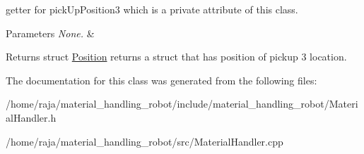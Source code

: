 getter for pick\+Up\+Position3 which is a private attribute of this class. 


\begin{DoxyParams}{Parameters}
{\em None.} & \\
\hline
\end{DoxyParams}
\begin{DoxyReturn}{Returns}
struct \hyperlink{structPosition}{Position} returns a struct that has position of pickup 3 location. 
\end{DoxyReturn}


The documentation for this class was generated from the following files\+:\begin{DoxyCompactItemize}
\item 
/home/raja/material\+\_\+handling\+\_\+robot/include/material\+\_\+handling\+\_\+robot/Material\+Handler.\+h\item 
/home/raja/material\+\_\+handling\+\_\+robot/src/Material\+Handler.\+cpp\end{DoxyCompactItemize}
